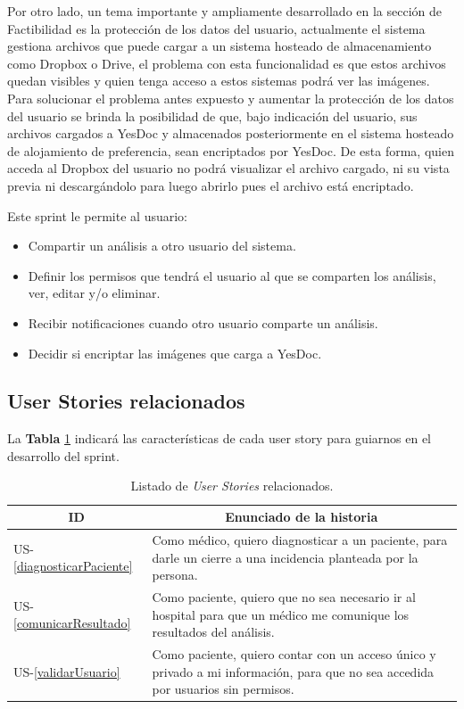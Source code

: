   Por otro lado, un tema importante y ampliamente desarrollado en la sección de Factibilidad es la protección de los datos del usuario, actualmente el sistema gestiona archivos que puede cargar a un sistema hosteado de almacenamiento como Dropbox o Drive, el problema con esta funcionalidad es que estos archivos quedan visibles y quien tenga acceso a estos sistemas podrá ver las imágenes. Para solucionar el problema antes expuesto y aumentar la protección de los datos del usuario se brinda la posibilidad de que, bajo indicación del usuario, sus archivos cargados a YesDoc y almacenados posteriormente en el sistema hosteado de alojamiento de preferencia, sean encriptados por YesDoc. De esta forma, quien acceda al Dropbox del usuario no podrá visualizar el archivo cargado, ni su vista previa ni descargándolo para luego abrirlo pues el archivo está encriptado. 

Este sprint le permite al usuario:
	\begin{itemize}
		\item Compartir un análisis a otro usuario del sistema.
		\item Definir los permisos que tendrá el usuario al que se comparten los análisis, ver, editar y/o eliminar.
		\item Recibir notificaciones cuando otro usuario comparte un análisis.  
		\item Decidir si encriptar las imágenes que carga a YesDoc.
	\end{itemize}
	
\subsection{User Stories relacionados}
La \textbf{Tabla} \ref{US-Sprint8} indicará las características de cada user story para guiarnos en el desarrollo del sprint.

\newpage

\begin{table}[h]
	\centering
	\begin{tabular}{|l|p{9cm}|}
		\hline
		\multicolumn{1}{|c|}{\textbf{ID}} &
		\multicolumn{1}{|c|}{\textbf{Enunciado de la historia}} \\  
		\hline
		US-\ref{diagnosticarPaciente} &
		Como médico, quiero diagnosticar a un paciente, para darle un cierre a una incidencia planteada por la persona. \\ 
		\hline
		US-\ref{comunicarResultado} &
		Como paciente, quiero que no sea necesario ir al hospital para que un médico me comunique los resultados del análisis. \\       
		\hline
		US-\ref{validarUsuario} &
		Como paciente, quiero contar con un acceso único y privado a mi información, para que no sea accedida por usuarios sin permisos. \\
		\hline
	\end{tabular}
	\caption{Listado de \textit{User Stories} relacionados.}
	\label{US-Sprint8}
\end{table}

